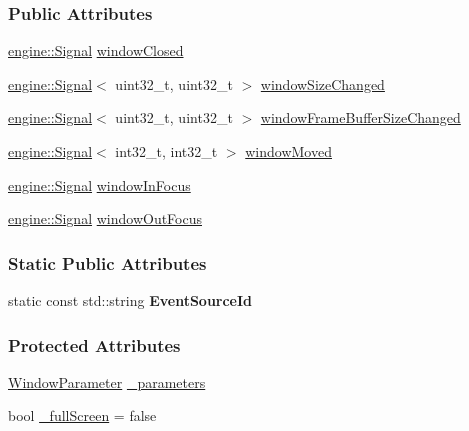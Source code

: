 \subsubsection*{Public Attributes}
\begin{DoxyCompactItemize}
\item 
\hyperlink{a00065}{engine\+::\+Signal} \hyperlink{a00082_a5bb494c228eb398d6893327fcf03d2d3}{window\+Closed}
\item 
\hyperlink{a00065}{engine\+::\+Signal}$<$ uint32\+\_\+t, uint32\+\_\+t $>$ \hyperlink{a00082_a20978a09b8843aa8960dc9d3a989b11a}{window\+Size\+Changed}
\item 
\hyperlink{a00065}{engine\+::\+Signal}$<$ uint32\+\_\+t, uint32\+\_\+t $>$ \hyperlink{a00082_a0c6ef7abcac1063c91a84123c81f9347}{window\+Frame\+Buffer\+Size\+Changed}
\item 
\hyperlink{a00065}{engine\+::\+Signal}$<$ int32\+\_\+t, int32\+\_\+t $>$ \hyperlink{a00082_a4bdb42d789ed9587ff8f840065752506}{window\+Moved}
\item 
\hyperlink{a00065}{engine\+::\+Signal} \hyperlink{a00082_a2a81dc83b5e8433eb39e1ca8263d0c0f}{window\+In\+Focus}
\item 
\hyperlink{a00065}{engine\+::\+Signal} \hyperlink{a00082_af6f8cc0d616685683d5c6b52b4cc07d0}{window\+Out\+Focus}
\end{DoxyCompactItemize}
\subsubsection*{Static Public Attributes}
\begin{DoxyCompactItemize}
\item 
static const std\+::string {\bfseries Event\+Source\+Id}\hypertarget{a00082_aed5e1991e9a16cc45ce80f4477e33fb9}{}\label{a00082_aed5e1991e9a16cc45ce80f4477e33fb9}

\end{DoxyCompactItemize}
\subsubsection*{Protected Attributes}
\begin{DoxyCompactItemize}
\item 
\hyperlink{a00091}{Window\+Parameter} \hyperlink{a00082_aae1d39f3df529497025772967ac578a0}{\+\_\+parameters}
\item 
bool \hyperlink{a00082_a5167b1318668d7639112ce85eafc6c8b}{\+\_\+full\+Screen} = false
\end{DoxyCompactItemize}
